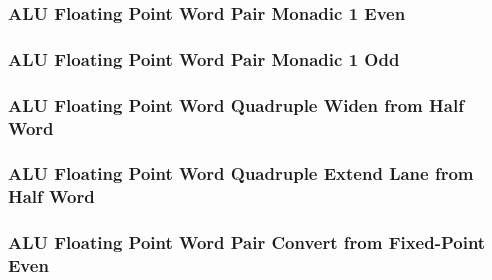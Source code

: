 

\subsubsection[{\small ALU Floating Point Word Pair Monadic 1 Even}]{ALU Floating Point Word Pair Monadic 1 Even} \label{sec:format-ALU-FWPMO1E}



\subsubsection[{\small ALU Floating Point Word Pair Monadic 1 Odd}]{ALU Floating Point Word Pair Monadic 1 Odd} \label{sec:format-ALU-FWPMO1O}



\subsubsection[{\small ALU Floating Point Word Quadruple Widen from Half Word}]{ALU Floating Point Word Quadruple Widen from Half Word} \label{sec:format-ALU-FWQWIDEWR}



\subsubsection[{\small ALU Floating Point Word Quadruple Extend Lane from Half Word}]{ALU Floating Point Word Quadruple Extend Lane from Half Word} \label{sec:format-ALU-FWQEXTLWR}



\subsubsection[{\small ALU Floating Point Word Pair Convert from Fixed-Point Even}]{ALU Floating Point Word Pair Convert from Fixed-Point Even} \label{sec:format-ALU-FWPFLOATE}

